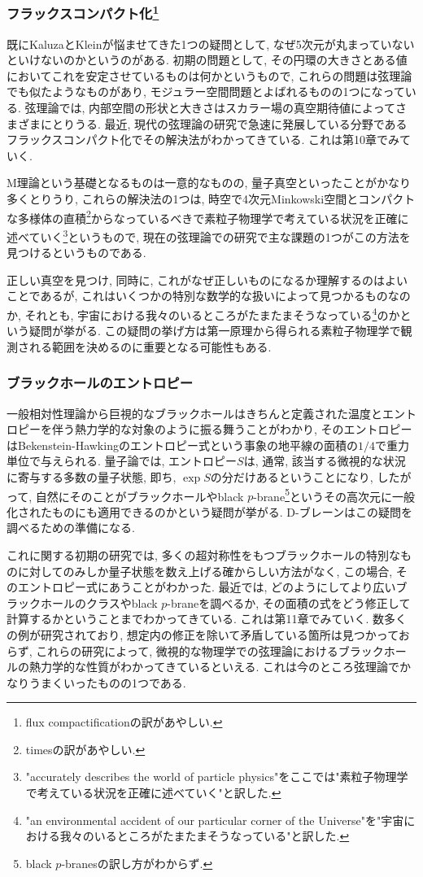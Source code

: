 \documentclass[10pt,a4paper]{jsarticle}
\begin{document}
\subsubsection*{フラックスコンパクト化\footnote{flux compactificationの訳があやしい. }}
既にKaluzaとKleinが悩ませてきた1つの疑問として, なぜ5次元が丸まっていないといけないのかというのがある. 初期の問題として, その円環の大きさとある値においてこれを安定させているものは何かというもので, これらの問題は弦理論でも似たようなものがあり, モジュラー空間問題とよばれるものの1つになっている. 弦理論では, 内部空間の形状と大きさはスカラー場の真空期待値によってさまざまにとりうる. 最近, 現代の弦理論の研究で急速に発展している分野であるフラックスコンパクト化でその解決法がわかってきている. これは第10章でみていく. \par
M理論という基礎となるものは一意的なものの, 量子真空といったことがかなり多くとりうり, これらの解決法の1つは, 時空で4次元Minkowski空間とコンパクトな多様体の直積\footnote{timesの訳があやしい. }からなっているべきで素粒子物理学で考えている状況を正確に述べていく\footnote{"accurately describes the world of particle physics"をここでは"素粒子物理学で考えている状況を正確に述べていく"と訳した. }というもので, 現在の弦理論での研究で主な課題の1つがこの方法を見つけるというものである. \par
正しい真空を見つけ, 同時に, これがなぜ正しいものになるか理解するのはよいことであるが, これはいくつかの特別な数学的な扱いによって見つかるものなのか, それとも, 宇宙における我々のいるところがたまたまそうなっている\footnote{"an environmental accident of our particular corner of the Universe"を"宇宙における我々のいるところがたまたまそうなっている"と訳した. }のかという疑問が挙がる. この疑問の挙げ方は第一原理から得られる素粒子物理学で観測される範囲を決めるのに重要となる可能性もある. 
\subsubsection*{ブラックホールのエントロピー}
一般相対性理論から巨視的なブラックホールはきちんと定義された温度とエントロピーを伴う熱力学的な対象のように振る舞うことがわかり, そのエントロピーはBekenstein-Hawkingのエントロピー式という事象の地平線の面積の$1 / 4$で重力単位で与えられる. 量子論では, エントロピー$S$は, 通常, 該当する微視的な状況に寄与する多数の量子状態, 即ち, $\exp S$の分だけあるということになり, したがって, 自然にそのことがブラックホールやblack $p$-brane\footnote{black $p$-branesの訳し方がわからず. }というその高次元に一般化されたものにも適用できるのかという疑問が挙がる. D-ブレーンはこの疑問を調べるための準備になる. \par
これに関する初期の研究では, 多くの超対称性をもつブラックホールの特別なものに対してのみしか量子状態を数え上げる確からしい方法がなく, この場合, そのエントロピー式にあうことがわかった. 最近では, どのようにしてより広いブラックホールのクラスやblack $p$-braneを調べるか, その面積の式をどう修正して計算するかということまでわかってきている. これは第11章でみていく. 数多くの例が研究されており, 想定内の修正を除いて矛盾している箇所は見つかっておらず, これらの研究によって, 微視的な物理学での弦理論におけるブラックホールの熱力学的な性質がわかってきているといえる. これは今のところ弦理論でかなりうまくいったものの1つである. 
\end{document}
